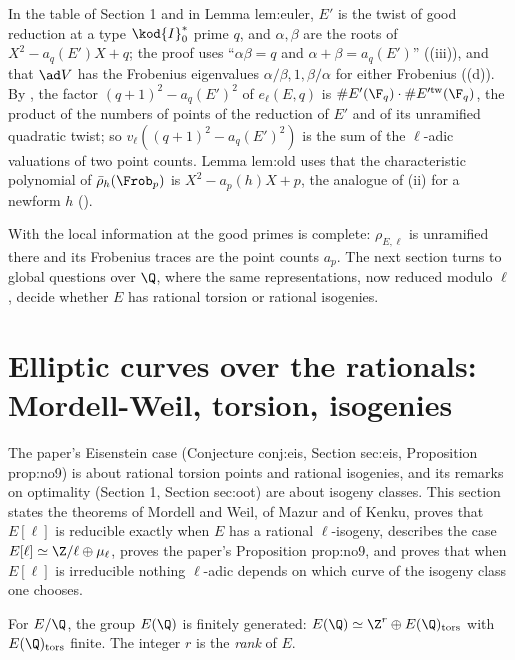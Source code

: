 \begin{paperlink}\label{pl:ellcurves:table}
In the table of Section 1 and in Lemma lem:euler, $E'$ is the twist of good reduction at a type $\kod{I}_0^*$ prime $q$, and $\alpha,\beta$ are the roots of $X^2-a_q(E')X+q$; the proof uses
``$\alpha\beta=q$ and $\alpha+\beta=a_q(E')$'' ((iii)), and that $\ad V$ has the Frobenius eigenvalues $\alpha/\beta,1,\beta/\alpha$ for either Frobenius
((d)). By , the factor $(q+1)^2-a_q(E')^2$ of $e_\ell(E,q)$ is $\#E'(\F_q)\cdot\#E'^{\mathrm{tw}}(\F_q)$, the product of the numbers of points of
the reduction of $E'$ and of its unramified quadratic twist; so $v_\ell((q+1)^2-a_q(E')^2)$ is the sum of the $\ell$-adic valuations of two point counts. Lemma lem:old uses that the characteristic
polynomial of $\bar\rho_h(\Frob_p)$ is $X^2-a_p(h)X+p$, the analogue of (ii) for a newform $h$ ().
\end{paperlink}

\noindent With  the local information at the good primes is complete: $\rho_{E,\ell}$ is unramified there and its Frobenius traces are the point counts
$a_p$. The next section turns to global questions over $\Q$, where the same representations, now reduced modulo $\ell$, decide whether $E$ has rational torsion or rational
isogenies.
\section[Curves over the rationals: torsion and isogenies]{Elliptic curves over the rationals: Mordell-Weil, torsion, isogenies}\label{sec:ellcurves:overQ}

The paper's Eisenstein case (Conjecture conj:eis, Section sec:eis, Proposition prop:no9) is about rational torsion points and rational isogenies, and its
remarks on optimality (Section 1, Section sec:oot) are about isogeny classes. This section states the theorems of Mordell and Weil, of Mazur and of Kenku,
proves that $E[\ell]$ is reducible exactly when $E$ has a rational $\ell$-isogeny, describes the case $E[\ell]\simeq\Z/\ell\oplus\mu_\ell$, proves the paper's Proposition
prop:no9, and proves that when $E[\ell]$ is irreducible nothing $\ell$-adic depends on which curve of the isogeny class one chooses.

\begin{theorem}\label{thm:ellcurves:mordellweil}
For $E/\Q$, the group $E(\Q)$ is finitely generated: $E(\Q)\simeq\Z^r\oplus E(\Q)_{\mathrm{tors}}$ with $E(\Q)_{\mathrm{tors}}$ finite. The integer $r$ is the \emph{rank} of $E$.
\end{theorem}

